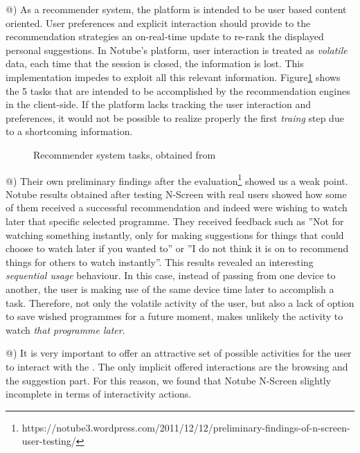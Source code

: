 \documentclass{acm_proc_article-sp}
\makeatletter
\newcommand*{\rom}[1]{\expandafter\@slowromancap\romannumeral #1@}
\makeatother
\begin{document}
\rom{1}) As a recommender system, the platform is intended to be user based content oriented. User preferences and explicit interaction should provide to the recommendation strategies an on-real-time update to re-rank the displayed personal suggestions\cite{libbyrecommender}. In Notube's platform, user interaction is treated as \textit{volatile} data, each time that the session is closed, the information is lost. This implementation impedes to exploit all this relevant information. Figure\ref{fig:recomm} shows the 5 tasks that are intended to be accomplished by the recommendation engines in the client-side. If the platform lacks tracking the user interaction and preferences, it would not be possible to realize properly the first \textit{traing} step due to a shortcoming information.

\begin{figure}[!htb]
\centering
{}
\caption{Recommender system tasks, obtained from \cite{libbyrecommender}}
\label{fig:recomm}
\end{figure}

\rom{2}) Their own preliminary findings after the evaluation\footnote{https://notube3.wordpress.com/2011/12/12/preliminary-findings-of-n-screen-user-testing/} showed us a weak point. Notube results obtained after testing N-Screen with real users showed how some of them received a successful recommendation and indeed were wishing to watch later that specific selected programme. They received feedback such as ''Not for watching something instantly, only for making suggestions for things that could choose to watch later if you wanted to'' or ''I do not think it is on to recommend things for others to watch instantly''. This results revealed an interesting \textit{sequential usage} behaviour. In this case, instead of passing from one device to another, the user is making use of the same device time later to accomplish a task. Therefore, not only the volatile activity of the user, but also a lack of option to save wished programmes for a future moment, makes unlikely the activity to watch \textit{that programme later}. 

\rom{3}) It is very important to offer an attractive set of possible activities for the user to interact with the \cite{skadberg2004visitors}. The only implicit offered interactions are the browsing and the suggestion part. For this reason, we found that Notube N-Screen slightly incomplete in terms of interactivity actions. 
\end{document}

